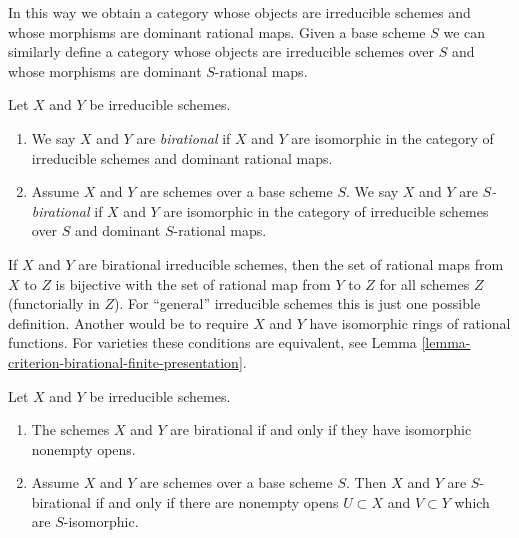 \medskip\noindent
In this way we obtain a category whose objects are irreducible schemes
and whose morphisms are dominant rational maps. Given a base scheme
$S$ we can similarly define a category whose objects are irreducible schemes
over $S$ and whose morphisms are dominant $S$-rational maps.

\begin{definition}
\label{definition-birational-schemes}
Let $X$ and $Y$ be irreducible schemes.
\begin{enumerate}
\item We say $X$ and $Y$ are {\it birational} if $X$ and $Y$ are isomorphic
in the category of irreducible schemes and dominant rational maps.
\item Assume $X$ and $Y$ are schemes over a base scheme $S$.
We say $X$ and $Y$ are {\it $S$-birational} if $X$ and $Y$ are
isomorphic in the category of irreducible schemes over $S$ and
dominant $S$-rational maps.
\end{enumerate}
\end{definition}

\noindent
If $X$ and $Y$ are birational irreducible schemes, then the set of rational
maps from $X$ to $Z$ is bijective with the set of rational map from $Y$ to $Z$
for all schemes $Z$ (functorially in $Z$). For ``general'' irreducible schemes
this is just one possible definition. Another would be
to require $X$ and $Y$ have isomorphic rings of rational functions. For
varieties these conditions are equivalent, see
Lemma \ref{lemma-criterion-birational-finite-presentation}.

\begin{lemma}
\label{lemma-birational-integral}
Let $X$ and $Y$ be irreducible schemes.
\begin{enumerate}
\item The schemes $X$ and $Y$ are birational if and only if they have
isomorphic nonempty opens.
\item Assume $X$ and $Y$ are schemes over a base scheme $S$. Then
$X$ and $Y$ are $S$-birational if and only if there are nonempty
opens $U \subset X$ and $V \subset Y$ which are $S$-isomorphic.
\end{enumerate}
\end{lemma}

